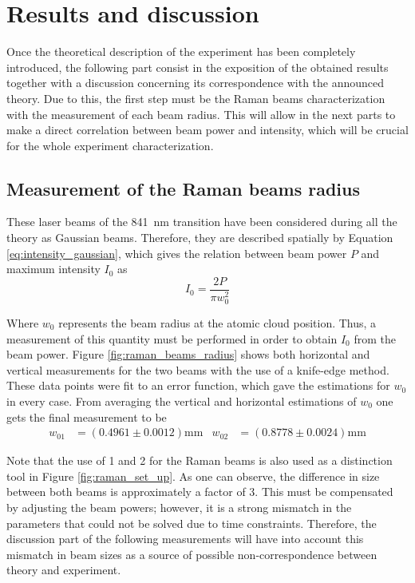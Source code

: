 
\chapter{Results and discussion}
\label{chap:results_and_discussion}

Once the theoretical description of the experiment has been completely introduced, the following part consist in the exposition of the obtained results together with a discussion concerning its correspondence with the announced theory. Due to this, the first step must be the Raman beams characterization with the measurement of each beam radius. This will allow in the next parts to make a direct correlation between beam power and intensity, which will be crucial for the whole experiment characterization.

\section{Measurement of the Raman beams radius}

These laser beams of the \SI{841}{\nano\meter} transition have been considered during all the theory as Gaussian beams. Therefore, they are described spatially by Equation \eqref{eq:intensity_gaussian}, which gives the relation between beam power $P$ and maximum intensity $I_{0}$ as
\begin{equation}
	I_0 = \frac{2P}{\pi w_0^2}
\end{equation}

Where $w_0$ represents the beam radius at the atomic cloud position. Thus, a measurement of this quantity must be performed in order to obtain $I_0$ from the beam power. Figure \ref{fig:raman_beams_radius} shows both horizontal and vertical measurements for the two beams with the use of a knife-edge method. These data points were fit to an error function, which gave the estimations for $w_0$ in every case. From averaging the vertical and horizontal estimations of $w_0$ one gets the final measurement to be
\begin{align*}
	w_{01} &= (0.4961\pm0.0012)\si{\milli\meter}   &   w_{02} &= (0.8778\pm0.0024)\si{\milli\meter}
\end{align*}

Note that the use of 1 and 2 for the Raman beams is also used as a distinction tool in Figure \ref{fig:raman_set_up}. As one can observe, the difference in size between both beams is approximately a factor of 3. This must be compensated by adjusting the beam powers; however, it is a strong mismatch in the parameters that could not be solved due to time constraints. Therefore, the discussion part of the following measurements will have into account this mismatch in beam sizes as a source of possible non-correspondence between theory and experiment.

